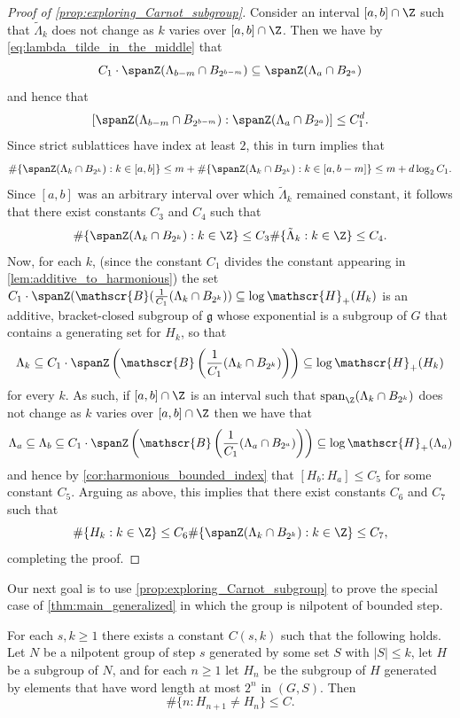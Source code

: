 \begin{proof}[Proof of \cref{prop:exploring_Carnot_subgroup}]
\medskip

Consider an interval $[a,b]\cap \Z$ such that $\tilde \Lambda_k$ does not change as $k$ varies over $[a,b]\cap \Z$. 
%
Then we have by \eqref{eq:lambda_tilde_in_the_middle} that
\[
C_1\cdot \spanZ(\Lambda_{b-m} \cap B_{2^{b-m}}) \subseteq \spanZ(\Lambda_a\cap B_{2^a})
\]
and hence that
\[
[\spanZ(\Lambda_{b-m} \cap B_{2^{b-m}}):\spanZ(\Lambda_a\cap B_{2^a})]\leq C_1^d.
\]
Since strict sublattices have index at least $2$, this in turn implies that 
\[
\#\{\spanZ(\Lambda_{k} \cap B_{2^{k}}) : k \in [a,b]\} \leq m + \#\{\spanZ(\Lambda_{k} \cap B_{2^{k}}) : k \in [a,b-m]\} \leq m + d \log_2 C_1.
\]
Since $[a,b]$ was an arbitrary interval over which $\tilde \Lambda_k$ remained constant, it follows that there exist constants $C_3$ and $C_4$ such that
\[
\#\{\spanZ(\Lambda_{k} \cap B_{2^{k}}) : k \in \Z\} \leq C_3 \#\{\tilde \Lambda_k : k \in \Z\} \leq C_4.
\]
Now, for each $k$, (since the constant $C_1$ divides the constant appearing in \cref{lem:additive_to_harmonious}) the set $C_1 \cdot \spanZ(\mathscr{B}(\frac{1}{C_1} (\Lambda_k \cap B_{2^k})) \subseteq \log\mathscr{H}_+(H_k)$ is an additive, bracket-closed subgroup of $\mathfrak{g}$ whose exponential is a subgroup of $G$ that contains a generating set for $H_k$, so that
\[
\Lambda_k \subseteq C_1 \cdot \spanZ\left(\mathscr{B}\left(\frac{1}{C_1} (\Lambda_k \cap B_{2^k})\right)\right) \subseteq \log \mathscr{H}_+(H_k)
\]
for every $k$.
As such, if  $[a,b]\cap \Z$ is an interval such that $\operatorname{span}_\Z(\Lambda_k \cap B_{2^k})$ does not change as $k$ varies over $[a,b]\cap \Z$ then we have that
\[
\Lambda_a \subseteq \Lambda_b \subseteq C_1 \cdot \spanZ\left(\mathscr{B}\left(\frac{1}{C_1} (\Lambda_a \cap B_{2^a})\right)\right) \subseteq  \log \mathscr{H}_+(\Lambda_a)
%
\]
and hence by \cref{cor:harmonious_bounded_index} that $[H_b:H_a] \leq C_5$ for some constant $C_5$. Arguing as above, this implies that there exist constants $C_6$ and $C_7$ such that
\[
\#\{H_k :k\in \Z\} \leq C_6 \#\{\spanZ(\Lambda_{k} \cap B_{2^{k}}) : k \in \Z\}  \leq C_7,
\]
completing the proof. \qedhere
\end{proof}


Our next goal is to use \cref{prop:exploring_Carnot_subgroup} to prove the special case of \cref{thm:main_generalized} in which the group is nilpotent of bounded step.


\begin{prop}
\label{prop:main_nilpotent}
For each $s,k\geq 1$ there exists a constant $C(s,k)$ such that the following holds.
Let $N$ be a nilpotent group of step $s$ generated by some set $S$ with $|S|\leq k$, let $H$ be a subgroup of $N$, and for each $n\geq 1$ let $H_n$ be the subgroup of $H$ generated by elements that have word length at most $2^n$ in $(G,S)$. Then 
\[
\#\{n:H_{n+1}\neq H_n\} \leq C.
\]
\end{prop}

